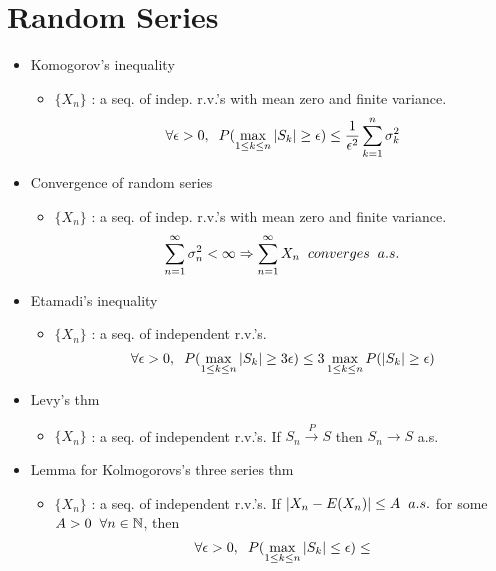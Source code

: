 \documentclass[12pt, A4]{article}
\begin{document}
\section{Random Series}
\begin{itemize}
	\item Komogorov's inequality
	\begin{itemize}
		\item $\{X_n\}$ : a seq. of indep. r.v.'s with mean zero and finite variance. 
		\newline$$\forall \epsilon>0,\hspace{0.2cm} P(\max_{1\leq k \leq n}|S_k|\geq \epsilon)\leq \frac{1}{\epsilon^2}\sum_{k=1}^n \sigma_k^2$$
	\end{itemize}
	\item Convergence of random series
	\begin{itemize}
		\item $\{X_n\}$ : a seq. of indep. r.v.'s with mean zero and finite variance.  
		\[\sum_{n=1}^{\infty}\sigma_n^2<\infty \Rightarrow \sum_{n=1}^{\infty}X_n \hspace{0.2cm} converges\hspace{0.2cm} a.s.\] 
	\end{itemize}
	\item Etamadi's inequality
	\begin{itemize}
		\item $\{X_n\}$ : a seq. of independent r.v.'s. \newline $$\forall \epsilon>0, \hspace{0.2cm} P(\max_{1\leq k\leq n}|S_k|\geq3\epsilon) \leq 3\max_{1\leq k \leq n}P(|S_k| \geq \epsilon)$$
	\end{itemize}
	\item Levy's thm
	\begin{itemize}
		\item $\{X_n\}$ : a seq. of independent r.v.'s. If $S_n\xrightarrow{P}S$ then $S_n\rightarrow S$ a.s.
	\end{itemize}
	\item Lemma for Kolmogorovs's three series thm
	\begin{itemize}
		\item $\{X_n\}$ : a seq. of independent r.v.'s. \newline If $|X_n-E(X_n)| \leq A \hspace{0.2cm} a.s.$ for some $A>0 \hspace{0.2cm} \forall n\in \mathbb{N}$, then $$\forall \epsilon>0, \hspace{0.2cm} P(\max_{1\leq k \leq n}|S_k|\leq\epsilon)\leq
$$
\end{itemize}
\end{itemize}
\end{document}
